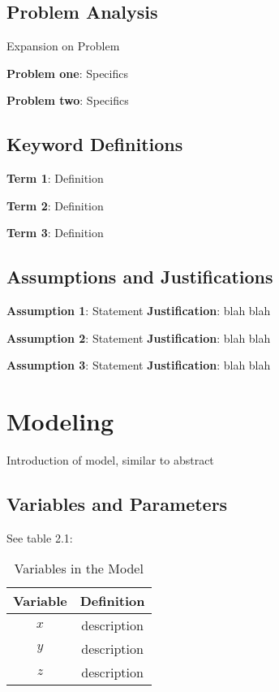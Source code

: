 \documentclass{mcmthesis}
\begin{document}
    \subsection{Problem Analysis}
    Expansion on Problem

    \noindent\textbf{Problem one}: Specifics

    \noindent\textbf{Problem two}: Specifics

    \subsection{Keyword Definitions}
    \noindent\textbf{Term 1}: Definition

    \noindent\textbf{Term 2}: Definition

    \noindent\textbf{Term 3}: Definition

    \subsection{Assumptions and Justifications}
    \noindent\textbf{Assumption 1}: Statement
    \textbf{Justification}: blah blah

    \noindent\textbf{Assumption 2}: Statement
    \textbf{Justification}: blah blah

    \noindent\textbf{Assumption 3}: Statement
    \textbf{Justification}: blah blah


    \section{Modeling}
    Introduction of model, similar to abstract

    \subsection{Variables and Parameters}
    See table 2.1:
    \begin{table}[h!]
        \centering
        \begin{tabular}{cc}
            \toprule
            Variable & Definition      \\
            \midrule
            $x$      & description     \\
            $y$      & description     \\
            $z$      & description     \\
            \bottomrule
        \end{tabular}
        \caption{Variables in the Model}
        \label{tab:my_label}
    \end{table}
\end{document}
